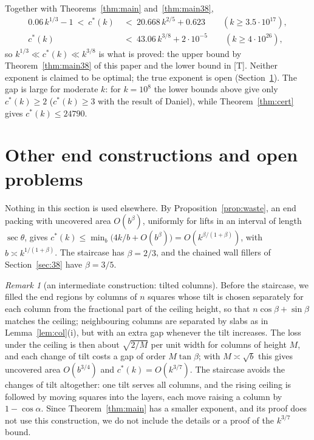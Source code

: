 \documentclass[11pt]{amsart}
\newcommand{\cs}{c^{*}}
\theoremstyle{definition}
\theoremstyle{remark}
\newtheorem{remark}[theorem]{Remark}
\numberwithin{equation}{section}
\begin{document}
Together with Theorems~\ref{thm:main} and~\ref{thm:main38},
\begin{align*}
0.06\,k^{1/3}-1\ <\ \cs(k)\ &<\ 20.668\,k^{2/5}+0.623\qquad(k\ge3.5\cdot10^{17}),\\
\cs(k)\ &<\ 43.06\,k^{3/8}+2\cdot10^{-5}\qquad(k\ge4\cdot10^{26}),
\end{align*}
so $k^{1/3}\ll\cs(k)\ll k^{3/8}$ is what is proved: the upper bound by Theorem~\ref{thm:main38} of this paper and the
lower bound in [T]. Neither exponent is claimed to be optimal; the true exponent is open
(Section~\ref{sec:open}). The gap is large for moderate $k$: for $k=10^8$ the lower bounds above give only
$\cs(k)\ge2$ ($\cs(k)\ge3$ with the result of Daniel), while Theorem~\ref{thm:cert} gives $\cs(k)\le24790$.

\section{Other end constructions and open problems}\label{sec:open}

Nothing in this section is used elsewhere. By Proposition~\ref{prop:waste}, an end packing with uncovered area
$O(b^{\beta})$, uniformly for lifts in an interval of length $\sec\theta$, gives
$\cs(k)\le\min_b\bigl(4k/b+O(b^{\beta})\bigr)=O(k^{\beta/(1+\beta)})$, with $b\asymp k^{1/(1+\beta)}$. The staircase
has $\beta=2/3$, and the chained wall fillers of Section~\ref{sec:38} have $\beta=3/5$.

\begin{remark}[an intermediate construction: tilted columns]\label{rem:37}
Before the staircase, we filled the end regions by columns of $n$ squares whose tilt is chosen separately for each
column from the fractional part of the ceiling height, so that $n\cos\beta+\sin\beta$ matches the ceiling; neighbouring
columns are separated by slabs as in Lemma~\ref{lem:col}(i), but with an extra gap whenever the tilt increases. The
loss under the ceiling is then about $\sqrt{2/M}$ per unit width for columns of height $M$, and each change of tilt
costs a gap of order $M\tan\beta$; with $M\asymp\sqrt b$ this gives uncovered area $O(b^{3/4})$ and $\cs(k)=O(k^{3/7})$.
The staircase avoids the changes of tilt altogether: one tilt serves all columns, and the rising ceiling is followed
by moving squares into the layers, each move raising a column by $1-\cos\alpha$. Since Theorem~\ref{thm:main} has a smaller
exponent, and its proof does not use this construction, we do not include the details or a proof of the $k^{3/7}$
bound.
\end{remark}
\end{document}
